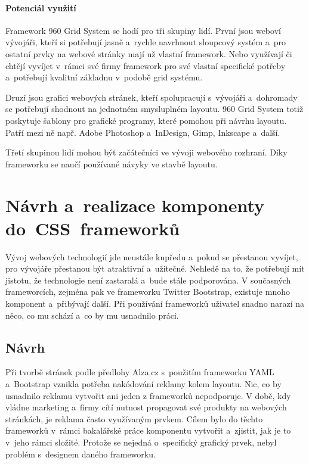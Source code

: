 \documentclass[thesis=B,czech]{FITthesis}[2012/06/26]
\begin{document}
\paragraph{Potenciál využití}

Framework 960 Grid System se hodí pro tři skupiny lidí. První jsou weboví vývojáři, kteří si potřebují jasně a~rychle navrhnout sloupcový systém a~pro ostatní prvky na webové stránky mají už vlastní framework. Nebo využívají či chtějí vyvíjet v~rámci své firmy framework pro své vlastní specifické potřeby a~potřebují kvalitní základnu v~podobě grid systému. 

Druzí jsou grafici webových stránek, kteří spolupracují s~vývojáři a~dohromady se potřebují shodnout na jednotném smysluplném layoutu. 960 Grid System totiž poskytuje šablony pro grafické programy, které pomohou při návrhu layoutu. Patří mezi ně např. Adobe Photoshop a~InDesign, Gimp, Inkscape a~další. 

Třetí skupinou lidí mohou být začátečníci ve vývoji webového rozhraní. Díky frameworku se naučí používané návyky ve stavbě layoutu.



\section{Návrh a~realizace komponenty do~CSS~frameworků}


Vývoj webových technologií jde neustále kupředu a~pokud se přestanou vyvíjet, pro vývojáře přestanou být atraktivní a~užitečné. Nehledě na to, že potřebují mít jistotu, že technologie není zastaralá a~bude stále podporována. V současných frameworcích, zejména pak ve frameworku Twitter Bootstrap, existuje mnoho komponent a~přibývají další. Při používání frameworků uživatel snadno narazí na něco, co mu schází a~co by mu usnadnilo práci.

\subsection{Návrh}

Při tvorbě stránek podle předlohy Alza.cz s~použitím frameworku \gls{YAML} a~Bootstrap vznikla potřeba nakódování reklamy kolem layoutu. Nic, co by usnadnilo reklamu vytvořit ani jeden z frameworků nepodporuje. V době, kdy vládne marketing a~firmy cítí nutnost propagovat své produkty na webových stránkách, je reklama často využívaným prvkem. Cílem bylo do těchto frameworků v~rámci bakalářské práce komponentu vytvořit a~zjistit, jak je to v~jeho rámci složité. Protože se nejedná o~specifický grafický prvek, nebyl problém s~designem daného frameworku.
\end{document}
